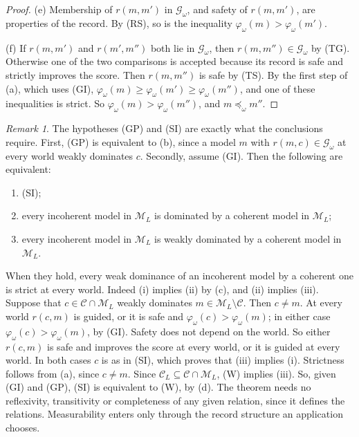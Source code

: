 \documentclass[11pt]{article}
\theoremstyle{definition}
\theoremstyle{remark}
\newtheorem{remark}[theorem]{Remark}
\newcommand{\M}{\mathcal M}
\newcommand{\C}{\mathcal C}
\newcommand{\G}{\mathcal G}
\begin{document}
\begin{proof}
(e) Membership of $r(m,m')$ in $\G_\omega$, and safety of $r(m,m')$, are properties of the record. By (RS), so is the inequality $\varphi_\omega(m)>\varphi_\omega(m')$.

(f) If $r(m,m')$ and $r(m',m'')$ both lie in $\G_\omega$, then $r(m,m'')\in\G_\omega$ by (TG). Otherwise one of the two comparisons is accepted because its record is safe and strictly improves the score. Then $r(m,m'')$ is safe by (TS). By the first step of (a), which uses (GI), $\varphi_\omega(m)\ge\varphi_\omega(m')\ge\varphi_\omega(m'')$, and one of these inequalities is strict. So $\varphi_\omega(m)>\varphi_\omega(m'')$, and $m\preceq_\omega m''$.
\end{proof}

\begin{remark}\label{rem:safe-tight}
The hypotheses (GP) and (SI) are exactly what the conclusions require. First, (GP) is equivalent to (b), since a model $m$ with $r(m,c)\in\G_\omega$ at every world weakly dominates $c$. Secondly, assume (GI). Then the following are equivalent:
\begin{enumerate}[label=(\roman*)]
\item (SI);
\item every incoherent model in $\M_L$ is dominated by a coherent model in $\M_L$;
\item every incoherent model in $\M_L$ is weakly dominated by a coherent model in $\M_L$.
\end{enumerate}
When they hold, every weak dominance of an incoherent model by a coherent one is strict at every world. Indeed (i) implies (ii) by (c), and (ii) implies (iii). Suppose that $c\in\C\cap\M_L$ weakly dominates $m\in\M_L\setminus\C$. Then $c\ne m$. At every world $r(c,m)$ is guided, or it is safe and $\varphi_\omega(c)>\varphi_\omega(m)$; in either case $\varphi_\omega(c)>\varphi_\omega(m)$, by (GI). Safety does not depend on the world. So either $r(c,m)$ is safe and improves the score at every world, or it is guided at every world. In both cases $c$ is as in (SI), which proves that (iii) implies (i). Strictness follows from (a), since $c\ne m$. Since $\C_L\subseteq\C\cap\M_L$, (W) implies (iii). So, given (GI) and (GP), (SI) is equivalent to (W), by (d). The theorem needs no reflexivity, transitivity or completeness of any given relation, since it defines the relations. Measurability enters only through the record structure an application chooses.
\end{remark}
\end{document}
